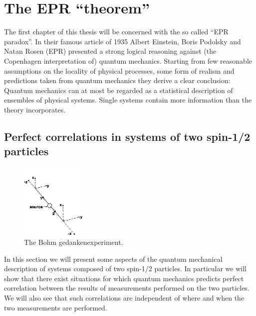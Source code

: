 \chapter{The EPR ``theorem''}
The first chapter of this thesis will be concerned with the so called ``EPR paradox''. In their famous article of 1935 \cite{PhysRev.47.777} Albert Einstein, Boris Podolsky and Natan Rosen (EPR) presented a strong logical reasoning against (the Copenhagen interpretation of) quantum mechanics. Starting from few reasonable assumptions on the locality of physical processes, some form of realism and predictions taken from quantum mechanics they derive a clear conclusion: Quantum mechanics can at most be regarded as a statistical description of ensembles of physical systems. Single systems contain more information than the theory incorporates.%


\section{Perfect correlations in systems of two spin-1/2 particles}
\label{sec:two-spin1/2}

\begin{figure}
  \centering
  \includegraphics[width=0.275\textwidth]{Mainmatter/Chapter1/eprb-gedankenexperiment.png}
  \caption{The Bohm gedankenexperiment.}
  \label{fig:eprb-gedankenexperiment}
\end{figure}

In this section we will present some aspects of the quantum mechanical description of systems composed of two spin-1/2 particles. In particular we will show that there exist situations for which quantum mechanics predicts perfect correlation between the results of measurements performed on the two particles. We will also see that such correlations are independent of where and when the two measurements are performed.%

